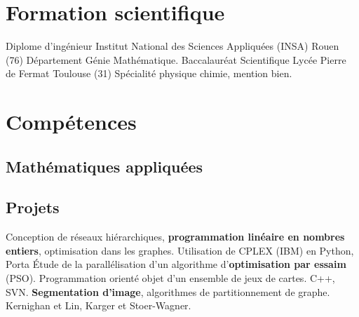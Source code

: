 \documentclass[10pt,a4paper,sans]{moderncv}%
\begin{document}
\section{Formation scientifique}
    {Diplome d'ingénieur}
    {Institut National des Sciences Appliquées (INSA)}
    {Rouen (76)}{}
    {Département Génie Mathématique.}
    {Baccalauréat Scientifique}
    {Lycée Pierre de Fermat}
    {Toulouse (31)}{}
    {Spécialité physique chimie, mention bien.}

\section{Compétences}
\subsection{Mathématiques appliquées}

\subsection{Projets}
    {Conception de réseaux hiérarchiques, \textbf{programmation linéaire en nombres entiers}, optimisation dans les graphes. Utilisation de CPLEX (IBM) en Python, Porta}
    {Étude de la parallélisation d'un algorithme d'\textbf{optimisation par essaim} (PSO).}
{}
    {Programmation orienté objet d'un ensemble de jeux de cartes. C++, SVN.}
    {\textbf{Segmentation d'image}, algorithmes de partitionnement de graphe. Kernighan et Lin, Karger et Stoer-Wagner.}
\end{document}
